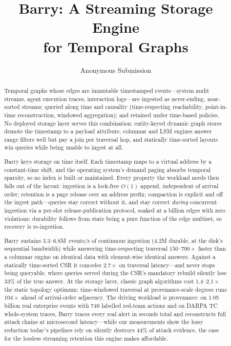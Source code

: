 \documentclass[11pt,letterpaper,twocolumn]{article}
\title{\textbf{Barry: A Streaming Storage Engine\\for Temporal Graphs}}
\author{Anonymous Submission}
\date{}
\begin{document}
\maketitle

\begin{abstract}
Temporal graphs whose edges are immutable timestamped events---system
audit streams, agent execution traces, interaction logs---are ingested
as never-ending, near-sorted streams; queried along time and causality
(time-respecting reachability, point-in-time reconstruction, windowed
aggregation); and retained under time-based policies. No deployed
storage layer serves this combination: entity-keyed dynamic graph
stores demote the timestamp to a payload attribute, columnar and LSM
engines answer range filters well but pay a join per traversal hop,
and statically time-sorted layouts win queries while being unable to
ingest at all.

Barry keys storage on time itself. Each timestamp maps to a virtual
address by a constant-time shift, and the operating system's demand
paging absorbs temporal sparsity, so no index is built or maintained.
Every property the workload needs then falls out of the layout:
ingestion is a lock-free $O(1)$ append, independent of arrival order;
retention is a page release over an address prefix; compaction is
explicit and off the ingest path---queries stay correct without it,
and stay correct \emph{during} concurrent ingestion via a per-slot
release-publication protocol, soaked at a billion edges with zero
violations; durability follows from state being a pure function of the
edge multiset, so recovery is re-ingestion.

Barry sustains 3.3--6.8M~events/s of continuous ingestion (4.2M
durable, at the disk's sequential bandwidth) while answering
time-respecting traversal $150$--$700\times$ faster than a columnar
engine on identical data with element-wise identical answers. Against
a statically time-sorted CSR it concedes $2.7\times$ on traversal
latency---and never stops being queryable, where queries served
during the CSR's mandatory rebuild silently lose $33\%$ of the true
answer. At the storage layer, classic graph algorithms cost
$1.4$--$2.1\times$ the static topology optimum; time-windowed
traversal at provenance-scale degrees runs $104\times$ ahead of
arrival-order adjacency. The driving workload is provenance: on 1.05
billion real enterprise events with 749 labelled red-team actions and
on DARPA TC whole-system traces, Barry traces every real alert in
seconds total and reconstructs full attack chains at microsecond
latency---while our measurements show the lossy reduction today's
pipelines rely on silently destroys 44\% of attack evidence, the case
for the lossless streaming retention this engine makes affordable.
\end{abstract}
\end{document}
